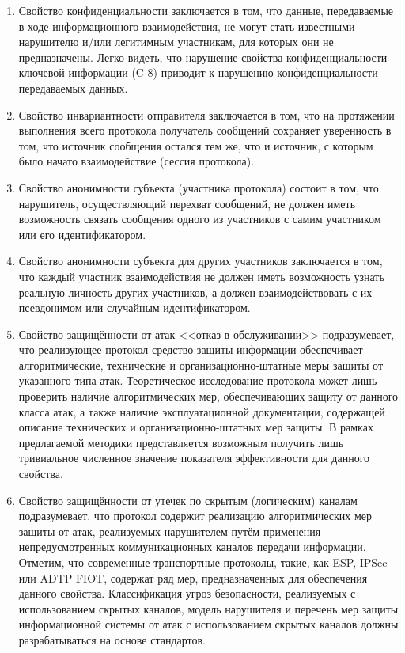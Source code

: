 \begin{enumerate}
	\item Свойство конфиденциальности заключается в том, что данные, передаваемые в ходе информационного взаимодействия, не могут стать известными нарушителю и/или легитимным участникам, для которых они не предназначены. Легко видеть, что нарушение свойства конфиденциальности ключевой информации (C 8) приводит к нарушению конфиденциальности передаваемых данных.
	
	\item Свойство инвариантности отправителя заключается в том, что на протяжении выполнения всего протокола получатель сообщений сохраняет уверенность в том, что источник сообщения остался тем же, что и источник, с которым было начато взаимодействие (сессия протокола).
	
	\item Свойство анонимности субъекта (участника протокола) состоит в том, что нарушитель, осуществляющий перехват сообщений, не должен иметь возможность связать сообщения одного из участников с самим участником или его идентификатором.
	
	\item Свойство анонимности субъекта для других участников заключается в том, что каждый участник взаимодействия не должен иметь возможность узнать реальную личность других участников, а должен взаимодействовать с их псевдонимом или случайным идентификатором.
	
	\item Свойство защищённости от атак <<отказ в обслуживании>> подразумевает, что реализующее протокол средство защиты информации обеспечивает алгоритмические, технические и организационно-штатные меры защиты от указанного типа атак. Теоретическое исследование протокола может лишь проверить наличие алгоритмических мер, обеспечивающих защиту от данного класса атак, а также наличие эксплуатационной документации, содержащей описание технических и организационно-штатных мер защиты. В рамках предлагаемой методики представляется возможным получить лишь тривиальное численное значение показателя эффективности для данного свойства.
	
	\item Свойство защищённости от утечек по скрытым (логическим) каналам подразумевает, что протокол содержит реализацию алгоритмических мер защиты от атак, реализуемых нарушителем путём применения непредусмотренных коммуникационных каналов передачи информации. Отметим, что современные транспортные протоколы, такие, как ESP, IPSec или ADTP FIOT, содержат ряд мер, предназначенных для обеспечения данного свойства. Классификация угроз безопасности, реализуемых с использованием скрытых каналов, модель нарушителя и перечень мер защиты информационной системы от атак с использованием скрытых каналов должны разрабатываться на основе стандартов.
	

\end{enumerate}

